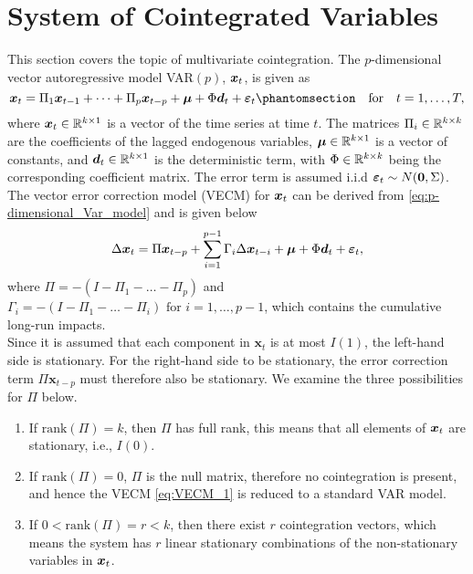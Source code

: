 \section{System of Cointegrated Variables}
This section covers the topic of multivariate cointegration. The $p$-dimensional vector autoregressive model VAR$(p)$, $\boldsymbol{x}_t$, is given as
\begin{equation}
    \boldsymbol{x}_t=\Pi_1 \b{x}_{t-1} + \dots + \Pi_p \b{x}_{t-p} + \b{\mu} + \Phi \boldsymbol{d}_t +\boldsymbol{\varepsilon}_t \phantomsection \:\:\: \text{ for } \:\:\: t=1,\dots,T,
    \label{eq:p-dimensional_Var_model}
\end{equation}
where $\boldsymbol{x}_t \in \mathbb{R}^{k\times 1}$ is a vector of the time series at time $t$. The matrices $\Pi_i\in \mathbb{R}^{k\times k}$ are the coefficients of the lagged endogenous variables, $\boldsymbol{\mu} \in \mathbb{R}^{k\times 1}$ is a vector of constants, and $\boldsymbol{d}_t \in \mathbb{R}^{k\times 1}$ is the deterministic term, with $\Phi \in \mathbb{R}^{k\times k}$ being the corresponding coefficient matrix. The error term is assumed i.i.d $\boldsymbol{\varepsilon}_t \sim N(\boldsymbol{0},\Sigma)$. The vector error correction model (VECM) for $\boldsymbol{x}_t$ can be derived from \eqref{eq:p-dimensional_Var_model} and is given below
\begin{equation}
    \Delta \boldsymbol{x}_t = \Pi \boldsymbol{x}_{t-p} + \sum_{i=1}^{p-1}\Gamma_i\Delta \boldsymbol{x}_{t-i} + \boldsymbol{\mu} + \Phi \boldsymbol{d}_t + \boldsymbol{\varepsilon}_t,
    \label{eq:VECM_1}
\end{equation}
where $\Pi=-(I-\Pi_1-\dots-\Pi_p)$ and 
$\Gamma_i=-(I-\Pi_{1}-\dots-\Pi_i) \text{ for } i=1,\dots,p-1$, which contains the cumulative long-run impacts.\\
Since it is assumed that each component in $\boldsymbol{x}_t$ is at most $I(1)$, the left-hand side is stationary. For the right-hand side to be stationary, the error correction term $\Pi\boldsymbol{x}_{t-p}$ must therefore also be stationary.
We examine the three possibilities for $\Pi$ below.
\begin{enumerate}
    \item If $\text{rank}(\Pi)=k$, then $\Pi$ has full rank, this means that all elements of $\boldsymbol{x}_t$ are stationary, i.e., $I(0)$.
    \item If $\text{rank}(\Pi)=0$, $\Pi$ is the null matrix, therefore no cointegration is present, and hence the VECM \eqref{eq:VECM_1} is reduced to a standard VAR model.
    \item If $0<\text{rank}(\Pi)=r<k$, then there exist $r$ cointegration vectors, which means the system has $r$ linear stationary combinations of the non-stationary variables in $\boldsymbol{x}_t$.
\end{enumerate}
